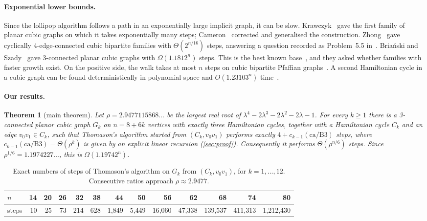 \documentclass[11pt]{article}
\newtheorem{theorem}{Theorem}
\theoremstyle{definition}
\begin{document}
\paragraph{Exponential lower bounds.} Since the lollipop algorithm follows a path in an
exponentially large implicit graph, it can be slow. Krawczyk~\cite{Krawczyk99} gave the first
family of planar cubic graphs on which it takes exponentially many steps; Cameron~\cite{Cameron01}
corrected and generalised the construction. Zhong~\cite{Zhong18} gave cyclically
4-edge-connected cubic bipartite families with $\Theta(2^{n/16})$ steps, answering a question
recorded as Problem~5.5 in~\cite{IML15}.
Bria\'nski and Szady~\cite{BrianskiSzady22} gave 3-connected planar cubic graphs with
$\Omega(1.1812^n)$ steps. This is the best known base~\cite{BKN24}, and they asked whether
families with faster growth exist. On the positive side, the walk takes at most $n$ steps on cubic
bipartite Pfaffian graphs~\cite{BKN24}. A second Hamiltonian cycle in a cubic graph can be found
deterministically in polynomial space and $O(1.23103^n)$ time~\cite{DMSZ20}.

\paragraph{Our results.}
\begin{theorem}[main theorem]\label{thm:main}
Let $\rho = 2.9477115868\ldots$ be the largest real root of
$\lambda^4 - 2\lambda^3 - 2\lambda^2 - 2\lambda - 1$. For every $k \ge 1$ there is a 3-connected
planar cubic graph $G_k$ on $n = 8+6k$ vertices with exactly three Hamiltonian cycles, together
with a Hamiltonian cycle $C_k$ and an edge $v_0v_1 \in C_k$, such that Thomason's algorithm started
from $(C_k, v_0v_1)$ performs exactly $4 + c_{k-1}(\mathrm{ca/B3})$ steps, where
$c_{k-1}(\mathrm{ca/B3}) = \Theta(\rho^{k})$ is given by an explicit linear recursion
(\cref{sec:proof}). Consequently it performs $\Theta(\rho^{n/6})$ steps. Since
$\rho^{1/6} = 1.1974227\ldots$, this is $\Omega(1.19742^n)$.
\end{theorem}

\begin{table}[h]
\centering\small
\begin{tabular}{l*{12}{r}}
\toprule
$n$ & 14 & 20 & 26 & 32 & 38 & 44 & 50 & 56 & 62 & 68 & 74 & 80 \\
\midrule
steps & 10 & 25 & 73 & 214 & 628 & 1{,}849 & 5{,}449 & 16{,}060 & 47{,}338 & 139{,}537 & 411{,}313 & 1{,}212{,}430 \\
\bottomrule
\end{tabular}
\caption{Exact numbers of steps of Thomason's algorithm on $G_k$ from $(C_k, v_0v_1)$, for
$k = 1, \dots, 12$. Consecutive ratios approach $\rho \approx 2.9477$.}
\label{tab:steps}
\end{table}
\end{document}
